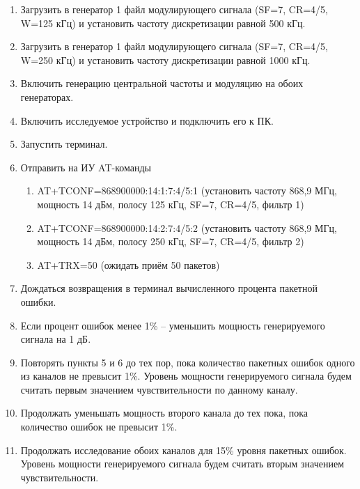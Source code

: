 \begin{enumerate}
	\item Загрузить в генератор 1 файл модулирующего сигнала (SF=7, CR=4/5, W=125 кГц) и установить частоту дискретизации равной 500 кГц. 
	\item Загрузить в генератор 1 файл модулирующего сигнала (SF=7, CR=4/5, W=250 кГц) и установить частоту дискретизации равной 1000 кГц. 
	\item Включить генерацию центральной частоты и модуляцию на обоих генераторах.
	\item Включить исследуемое устройство и подключить его к ПК.
	\item Запустить терминал. 
	\item Отправить на ИУ AT-команды
	\begin{enumerate}
		\item AT+TCONF=868900000:14:1:7:4/5:1 (установить частоту 868,9  МГц, мощность 14 дБм, полосу 125 кГц, SF=7, CR=4/5, фильтр 1)
		\item AT+TCONF=868900000:14:2:7:4/5:2 (установить частоту 868,9 МГц, мощность 14 дБм, полосу 250 кГц, SF=7, CR=4/5, фильтр 2)
		\item AT+TRX=50 (ожидать приём 50 пакетов)
	\end{enumerate}
	\item Дождаться возвращения в терминал вычисленного процента пакетной ошибки. 
	\item Если процент ошибок менее 1\% – уменьшить мощность генерируемого сигнала на 1 дБ.
	\item Повторять пункты 5 и 6 до тех пор, пока количество пакетных ошибок одного из каналов не превысит 1\%. Уровень мощности генерируемого сигнала будем считать первым значением чувствительности по данному каналу.
	\item Продолжать уменьшать мощность второго канала до тех пока, пока количество ошибок  не превысит 1\%.
	\item Продолжать исследование обоих каналов для 15\% уровня пакетных ошибок. Уровень мощности генерируемого сигнала будем считать вторым значением чувствительности. 
\end{enumerate}















